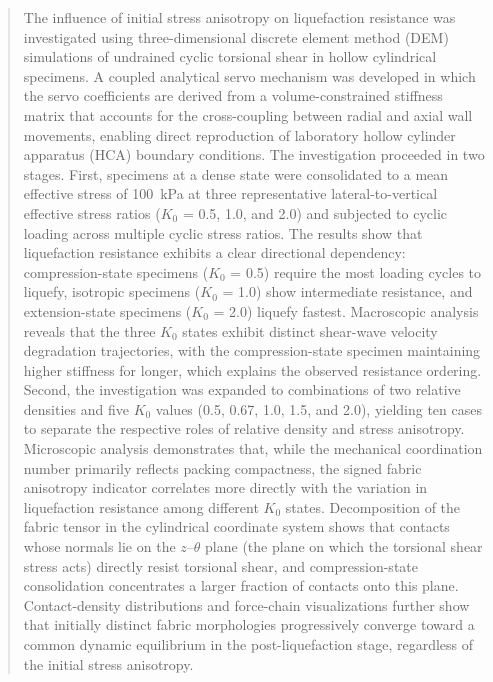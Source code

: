\documentclass[a4paper,fleqn]{cas-sc}
\newcommand{\Kzero}{\ensuremath{K_0}}
\begin{document}
\begin{abstract}
The influence of initial stress anisotropy on liquefaction resistance was investigated using three-dimensional discrete element method (DEM) simulations of undrained cyclic torsional shear in hollow cylindrical specimens. A coupled analytical servo mechanism was developed in which the servo coefficients are derived from a volume-constrained stiffness matrix that accounts for the cross-coupling between radial and axial wall movements, enabling direct reproduction of laboratory hollow cylinder apparatus (HCA) boundary conditions. The investigation proceeded in two stages. First, specimens at a dense state were consolidated to a mean effective stress of 100~kPa at three representative lateral-to-vertical effective stress ratios (\Kzero{} = 0.5, 1.0, and 2.0) and subjected to cyclic loading across multiple cyclic stress ratios. The results show that liquefaction resistance exhibits a clear directional dependency: compression-state specimens (\Kzero{} = 0.5) require the most loading cycles to liquefy, isotropic specimens (\Kzero{} = 1.0) show intermediate resistance, and extension-state specimens (\Kzero{} = 2.0) liquefy fastest. Macroscopic analysis reveals that the three \Kzero{} states exhibit distinct shear-wave velocity degradation trajectories, with the compression-state specimen maintaining higher stiffness for longer, which explains the observed resistance ordering. Second, the investigation was expanded to combinations of two relative densities and five \Kzero{} values (0.5, 0.67, 1.0, 1.5, and 2.0), yielding ten cases to separate the respective roles of relative density and stress anisotropy. Microscopic analysis demonstrates that, while the mechanical coordination number primarily reflects packing compactness, the signed fabric anisotropy indicator correlates more directly with the variation in liquefaction resistance among different \Kzero{} states. Decomposition of the fabric tensor in the cylindrical coordinate system shows that contacts whose normals lie on the $z$--$\theta$ plane (the plane on which the torsional shear stress acts) directly resist torsional shear, and compression-state consolidation concentrates a larger fraction of contacts onto this plane. Contact-density distributions and force-chain visualizations further show that initially distinct fabric morphologies progressively converge toward a common dynamic equilibrium in the post-liquefaction stage, regardless of the initial stress anisotropy.
\end{abstract}
\end{document}
